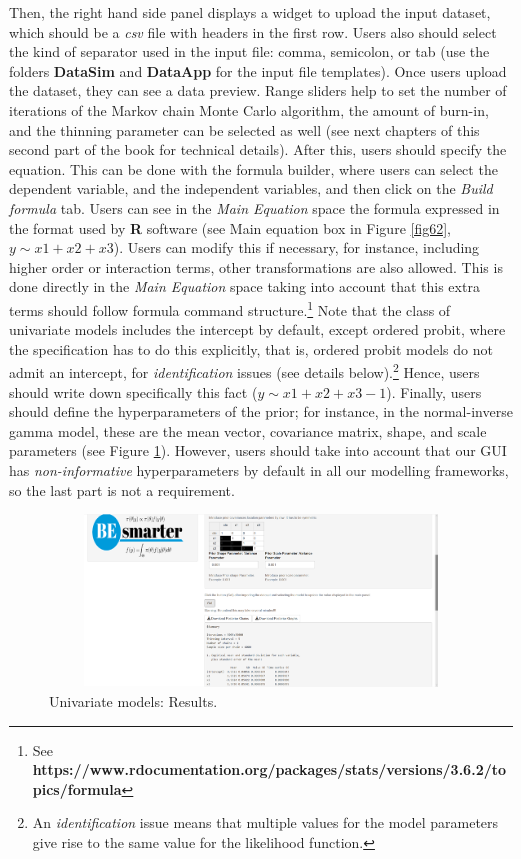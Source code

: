 Then, the right hand side panel displays a widget to upload the input dataset, which should be a \textit{csv} file with headers in the first row. Users also should select the kind of separator used in the input file: comma, semicolon, or tab (use the folders \textbf{DataSim} and \textbf{DataApp} for the input file templates). Once users upload the dataset, they can see a data preview. Range sliders help to set the number of iterations of the Markov chain Monte Carlo algorithm, the amount of burn-in, and the thinning parameter can be selected as well (see next chapters of this second part of the book for technical details). After this, users should specify the equation. This can be done with the formula builder, where users can select the dependent variable, and the independent variables, and then click on the \textit{Build formula} tab. Users can see in the \textit{Main Equation} space the formula expressed in the format used by \textbf{R} software (see Main equation box in Figure \ref{fig62}, $y\sim x1+x2+x3$). Users can modify this if necessary, for instance, including higher order or interaction terms, other transformations are also allowed. This is done directly in the \textit{Main Equation} space taking into account that this extra terms should follow formula command structure.\footnote{See \textbf{https://www.rdocumentation.org/packages/stats/versions/3.6.2/topics/formula}} Note that the class of univariate models includes the intercept by default, except ordered probit, where the specification has to do this explicitly, that is, ordered probit models do not admit an intercept, for \textit{identification} issues (see details below).\footnote{An \textit{identification} issue means that multiple values for the model parameters give rise to the same value for the likelihood function.} Hence, users should write down specifically this fact ($y\sim x1+x2+x3-1$). Finally, users should define the hyperparameters of the prior; for instance, in the normal-inverse gamma model, these are the mean vector, covariance matrix, shape, and scale parameters (see Figure \ref{fig63}). However, users should take into account that our GUI has \textit{non-informative} hyperparameters by default in all our modelling frameworks, so the last part is not a requirement.

\begin{figure}
	\includegraphics[width=340pt, height=130pt]{Chapters/chapterGUI/figures/Figure3.png}
	\caption[List of figure caption goes here]{Univariate models: Results.}\label{fig63}
\end{figure}


